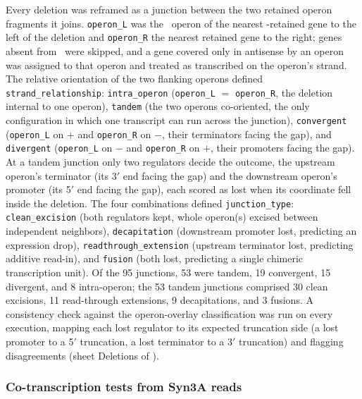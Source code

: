 Every deletion was reframed as a junction between the two retained operon fragments it joins.
\texttt{operon\_L} was the \syn~operon of the nearest \syna-retained gene to the left of the deletion and \texttt{operon\_R} the nearest retained gene to the right; genes absent from \syna~were skipped, and a gene covered only in antisense by an operon was assigned to that operon and treated as transcribed on the operon's strand.
The relative orientation of the two flanking operons defined \texttt{strand\_relationship}: \texttt{intra\_operon} (\texttt{operon\_L} $=$ \texttt{operon\_R}, the deletion internal to one operon), \texttt{tandem} (the two operons co-oriented, the only configuration in which one transcript can run across the junction), \texttt{convergent} (\texttt{operon\_L} on $+$ and \texttt{operon\_R} on $-$, their terminators facing the gap), and \texttt{divergent} (\texttt{operon\_L} on $-$ and \texttt{operon\_R} on $+$, their promoters facing the gap).
At a tandem junction only two regulators decide the outcome, the upstream operon's terminator (its 3$'$ end facing the gap) and the downstream operon's promoter (its 5$'$ end facing the gap), each scored as lost when its coordinate fell inside the deletion.
The four combinations defined \texttt{junction\_type}: \texttt{clean\_excision} (both regulators kept, whole operon(s) excised between independent neighbors), \texttt{decapitation} (downstream promoter lost, predicting an expression drop), \texttt{readthrough\_extension} (upstream terminator lost, predicting additive read-in), and \texttt{fusion} (both lost, predicting a single chimeric transcription unit).
Of the 95 junctions, 53 were tandem, 19 convergent, 15 divergent, and 8 intra-operon; the 53 tandem junctions comprised 30 clean excisions, 11 read-through extensions, 9 decapitations, and 3 fusions.
A consistency check against the operon-overlay classification was run on every execution, mapping each lost regulator to its expected truncation side (a lost promoter to a 5$'$ truncation, a lost terminator to a 3$'$ truncation) and flagging disagreements (sheet Deletions of \sdreduction).

\subsubsection{Co-transcription tests from Syn3A reads}

